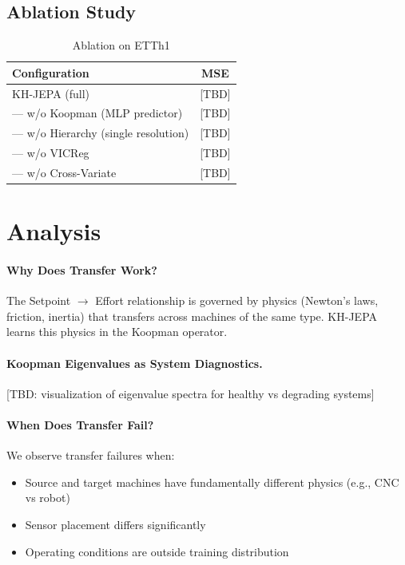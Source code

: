 \documentclass{article}
\begin{document}
\subsection{Ablation Study}

\begin{table}[h]
\centering
\caption{Ablation on ETTh1}
\begin{tabular}{lc}
\toprule
\textbf{Configuration} & \textbf{MSE} \\
\midrule
KH-JEPA (full) & [TBD] \\
— w/o Koopman (MLP predictor) & [TBD] \\
— w/o Hierarchy (single resolution) & [TBD] \\
— w/o VICReg & [TBD] \\
— w/o Cross-Variate & [TBD] \\
\bottomrule
\end{tabular}
\end{table}

\section{Analysis}

\paragraph{Why Does Transfer Work?} The Setpoint $\rightarrow$ Effort relationship is governed by physics (Newton's laws, friction, inertia) that transfers across machines of the same type. KH-JEPA learns this physics in the Koopman operator.

\paragraph{Koopman Eigenvalues as System Diagnostics.} [TBD: visualization of eigenvalue spectra for healthy vs degrading systems]

\paragraph{When Does Transfer Fail?} We observe transfer failures when:
\begin{itemize}
    \item Source and target machines have fundamentally different physics (e.g., CNC vs robot)
    \item Sensor placement differs significantly
    \item Operating conditions are outside training distribution
\end{itemize}
\end{document}

